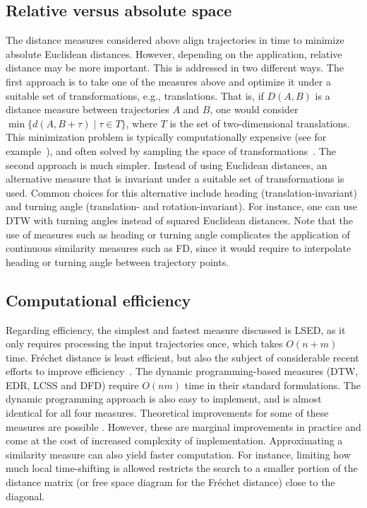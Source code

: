 \documentclass{interact}
\begin{document}
\subsection{Relative versus absolute space}

The distance measures considered above align trajectories in time to minimize absolute Euclidean distances. However, depending on the application, relative distance may be more important. This is addressed in two different ways. The first approach is to take one of the measures above and optimize it under a suitable set of transformations, e.g., translations. That is, if $D(A,B)$ is a distance measure between trajectories $A$ and $B$, one would consider $\min \{d(A,B + \tau)\;|\; \tau \in T \}$, where $T$ is the set of two-dimensional translations. This minimization problem is typically computationally expensive (see for example~\citealp{VlachosGK02}), and often solved by sampling the space of transformations~\citep{as-sm-12}. The second approach is much simpler. Instead of using Euclidean distances, an alternative measure that is invariant under a suitable set of transformations is used. Common choices for this alternative include heading (translation-invariant) and turning angle (translation- and rotation-invariant). For instance, one can use DTW with turning angles instead of squared Euclidean distances. 
Note that the use of measures such as heading or turning angle complicates the application of continuous similarity measures such as FD, since it would require to interpolate heading or turning angle between trajectory points. 

\subsection{Computational efficiency}

Regarding efficiency, the simplest and fastest measure discussed is LSED, as it only requires processing the input trajectories once, which takes $O(n+m)$ time. Fr\'echet distance is least efficient, but also the subject of considerable recent efforts to improve efficiency~\citep{bringmann2019walking}.
The dynamic programming-based measures (DTW, EDR, LCSS and DFD) require $O(nm)$ time in their standard formulations.
The dynamic programming approach is also easy to implement, and is almost identical for all four measures.
Theoretical improvements for some of these measures are possible \citep{DBLP:conf/icde/2002,bbmm-fswd-14,Masek198018}.
However, these are marginal improvements in practice and come at the cost of increased complexity of implementation.
Approximating a similarity measure can also yield faster computation. For instance, limiting how much local time-shifting is allowed restricts the search to a smaller portion of the distance matrix (or free space diagram for the Fr\'echet distance) close to the diagonal. 
\end{document}
